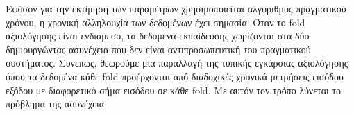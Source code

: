 \documentclass[a4paper,12pt]{article}
\begin{document}
Εφόσον για την εκτίμηση των παραμέτρων χρησιμοποιείται αλγόριθμος πραγματικού χρόνου, η χρονική αλληλουχία
των δεδομένων έχει σημασία. Όταν το fold αξιολόγησης είναι
ενδιάμεσο, τα δεδομένα εκπαίδευσης χωρίζονται στα δύο δημιουργώντας ασυνέχεια που δεν είναι αντιπροσωπευτική
του πραγματικού συστήματος. Συνεπώς, θεωρούμε μία παραλλαγή της τυπικής εγκάρσιας αξιολόγησης όπου τα δεδομένα
κάθε fold προέρχονται από διαδοχικές χρονικά μετρήσεις εισόδου 
εξόδου με διαφορετικό σήμα εισόδου σε κάθε fold. Με αυτόν τον
τρόπο λύνεται το πρόβλημα της ασυνέχεια 
\end{document}
